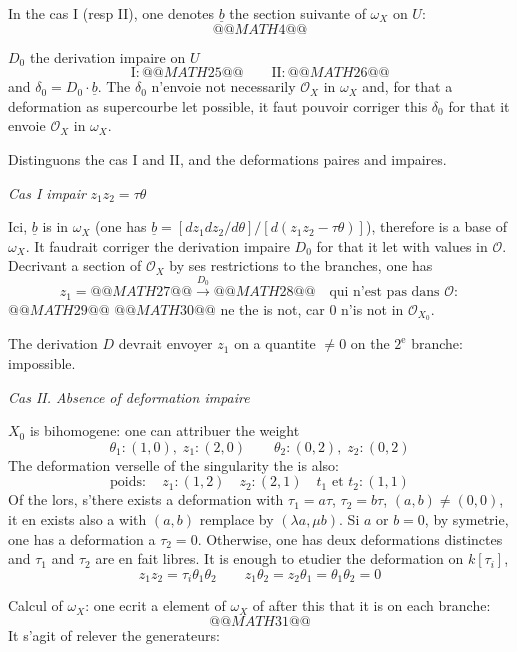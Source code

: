 \documentclass[11pt,a4paper]{article}
\theoremstyle{plain}
\theoremstyle{definition}
\begin{document}
In the cas I (resp II), one denotes $\underline{b}$ the section suivante of $\omega_X$ on $U$:
\[
@@MATH4@@
\]

$D_0$ the derivation impaire on $U$
\[
\text{I} : @@MATH25@@ \qquad
\text{II} : @@MATH26@@
\]
and $\delta_0 = D_0 \cdot \underline{b}$. The $\delta_0$ n'envoie not necessarily $\mathcal{O}_X$ in $\omega_X$ and, for that a deformation as supercourbe let possible, it faut pouvoir corriger this $\delta_0$ for that it envoie $\mathcal{O}_X$ in $\omega_X$.

Distinguons the cas I and II, and the deformations paires and impaires.

\medskip

\noindent \textit{Cas I impair} \hfill $z_1 z_2 = \tau \theta$

Ici, $\underline{b}$ is in $\omega_X$ (one has $\underline{b} = [dz_1 dz_2/d\theta] / [d(z_1 z_2 - \tau\theta)]$), therefore is a base of $\omega_X$. It faudrait corriger the derivation impaire $D_0$ for that it let with values in $\mathcal{O}$. Decrivant a section of $\mathcal{O}_X$ by ses restrictions to the branches, one has
\[
z_1 = @@MATH27@@ \xrightarrow{D_0}
@@MATH28@@ \quad \text{qui n'est pas dans } \mathcal{O} :
\]
$@@MATH29@@$ $@@MATH30@@$ ne the is not, car $0$ n'is not in $\mathcal{O}_{X_0}$.

The derivation $D$ devrait envoyer $z_1$ on a quantite $\neq 0$ on the $2^{\text{e}}$ branche: impossible.

\newpage

\noindent \textit{Cas II. Absence of deformation impaire}

$X_0$ is bihomogene: one can attribuer the weight
\[
\theta_1 : (1,0), \; z_1 : (2,0) \qquad \theta_2 : (0,2), \; z_2 : (0,2)
\]
The deformation verselle of the singularity the is also:
\[
\text{poids} : \quad z_1 : (1,2) \quad z_2 : (2,1) \quad t_1 \text{ et } t_2 : (1,1)
\]
Of the lors, s'there exists a deformation with $\tau_1 = a\tau$, $\tau_2 = b\tau$, $(a,b) \neq (0,0)$, it en exists also a with $(a,b)$ remplace by $(\lambda a, \mu b)$. Si $a$ or $b = 0$, by symetrie, one has a deformation a $\tau_2 = 0$. Otherwise, one has deux deformations distinctes and $\tau_1$ and $\tau_2$ are en fait libres. It is enough to etudier the deformation on $k[\tau_i]$,
\[
z_1 z_2 = \tau_i \theta_1 \theta_2 \qquad z_1 \theta_2 = z_2 \theta_1 = \theta_1 \theta_2 = 0
\]

Calcul of $\omega_X$: one ecrit a element of $\omega_X$ of after this that it is on each branche:
\[
@@MATH31@@
\]
It s'agit of relever the generateurs:
\end{document}
